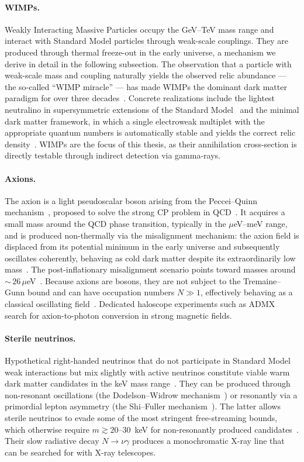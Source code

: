 \paragraph{WIMPs.}
Weakly Interacting Massive Particles occupy the GeV--TeV mass range and interact with Standard Model particles through weak-scale couplings.
They are produced through thermal freeze-out in the early universe, a mechanism we derive in detail in the following subsection.
The observation that a particle with weak-scale mass and coupling naturally yields the observed relic abundance --- the so-called ``WIMP miracle'' --- has made WIMPs the dominant dark matter paradigm for over three decades~\cite{Cirelli:2024ssz}.
Concrete realizations include the lightest neutralino in supersymmetric extensions of the Standard Model~\cite{Ellis:1983ew} and the minimal dark matter framework, in which a single electroweak multiplet with the appropriate quantum numbers is automatically stable and yields the correct relic density~\cite{Cirelli:2005uq}.
WIMPs are the focus of this thesis, as their annihilation cross-section is directly testable through indirect detection via gamma-rays.

\paragraph{Axions.}
The axion is a light pseudoscalar boson arising from the Peccei--Quinn mechanism~\cite{Peccei:1977hh}, proposed to solve the strong CP problem in QCD~\cite{Weinberg:1977ma,Wilczek:1977pj}.
It acquires a small mass around the QCD phase transition, typically in the $\mu$eV--meV range, and is produced non-thermally via the misalignment mechanism: the axion field is displaced from its potential minimum in the early universe and subsequently oscillates coherently, behaving as cold dark matter despite its extraordinarily low mass~\cite{Cirelli:2024ssz}.
The post-inflationary misalignment scenario points toward masses around ${\sim}\,26\,\mu$eV~\cite{Cirelli:2024ssz}.
Because axions are bosons, they are not subject to the Tremaine--Gunn bound and can have occupation numbers $N \gg 1$, effectively behaving as a classical oscillating field~\cite{Cirelli:2024ssz}.
Dedicated haloscope experiments such as ADMX search for axion-to-photon conversion in strong magnetic fields.

\paragraph{Sterile neutrinos.}
Hypothetical right-handed neutrinos that do not participate in Standard Model weak interactions but mix slightly with active neutrinos constitute viable warm dark matter candidates in the keV mass range~\cite{Cirelli:2024ssz}.
They can be produced through non-resonant oscillations (the Dodelson--Widrow mechanism~\cite{Dodelson:1993je}) or resonantly via a primordial lepton asymmetry (the Shi--Fuller mechanism~\cite{Shi:1998km}).
The latter allows sterile neutrinos to evade some of the most stringent free-streaming bounds, which otherwise require $m \gtrsim 20$--$30$~keV for non-resonantly produced candidates~\cite{Cirelli:2024ssz}.
Their slow radiative decay $N \to \nu \gamma$ produces a monochromatic X-ray line that can be searched for with X-ray telescopes.

